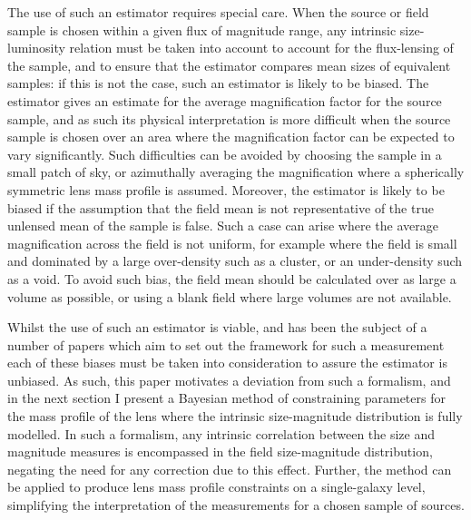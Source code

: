 \documentclass[useAMS,usenatbib,times,letter,amssymb]{mn2e}
\begin{document}
The use of such an estimator requires special care. When the source or field sample is chosen within a given flux of magnitude range, any intrinsic size-luminosity relation must be taken into account to account for the flux-lensing of the sample, and to ensure that the estimator compares mean sizes of equivalent samples: if this is not the case, such an estimator is likely to be biased. The estimator gives an estimate for the average magnification factor for the source sample, and as such its physical interpretation is more difficult when the source sample is chosen over an area where the magnification factor can be expected to vary significantly. Such difficulties can be avoided by choosing the sample in a small patch of sky, or azimuthally averaging the magnification where a spherically symmetric lens mass profile is assumed. Moreover, the estimator is likely to be biased if the assumption that the field mean is not representative of the true unlensed mean of the sample is false. Such a case can arise where the average magnification across the field is not uniform, for example where the field is small and dominated by a large over-density such as a cluster, or an under-density such as a void. To avoid such bias, the field mean should be calculated over as large a volume as possible, or using a blank field where large volumes are not available.

Whilst the use of such an estimator is viable, and has been the subject of a number of papers which aim to set out the framework for such a measurement \citep[e.g.][]{Heavens:2013p1550,Alsing:2014p2846,Casaponsa:2013p1480} each of these biases must be taken into consideration to assure the estimator is unbiased. As such, this paper motivates a deviation from such a formalism, and in the next section I present a Bayesian method of constraining parameters for the mass profile of the lens where the intrinsic size-magnitude distribution is fully modelled. In such a formalism, any intrinsic correlation between the size and magnitude measures is encompassed in the field size-magnitude distribution, negating the need for any correction due to this effect. Further, the method can be applied to produce lens mass profile constraints on a single-galaxy level, simplifying the interpretation of the measurements for a chosen sample of sources.
\end{document}
